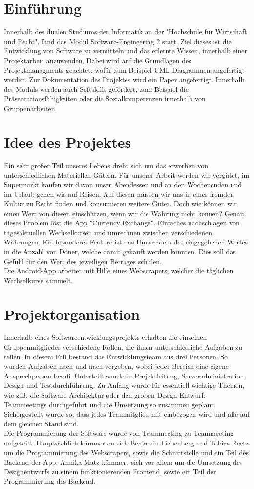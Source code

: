\documentclass[conference]{IEEEtran}
\begin{document}
\section{Einführung}
Innerhalb des dualen Studiums der Informatik an der "Hochschule für Wirtschaft und Recht", fand das Modul Software-Engineering 2 statt. Ziel dieses ist die Entwicklung von Software zu vermitteln und das erlernte Wissen, innerhalb einer Projektarbeit anzuwenden. Dabei wird auf die Grundlagen des Projektmanagments geachtet, wofür zum Beispiel UML-Diagrammen angefertigt werden. Zur Dokumentation des Projektes wird ein Paper angefertigt. 
Innerhalb des Moduls werden auch Softskills gefördert, zum Beispiel die Präsentationsfähigkeiten oder die Sozialkompetenzen innerhalb von Gruppenarbeiten.

\section{Idee des Projektes}
Ein sehr großer Teil unseres Lebens dreht sich um das erwerben von unterschiedlichen Materiellen Gütern. Für unserer Arbeit werden wir vergütet, im Supermarkt kaufen wir davon unser Abendessen und an den Wochenenden und im Urlaub gehen wir auf Reisen. Auf diesen müssen wir uns in einer fremden Kultur zu Recht finden und konsumieren weitere Güter. Doch wie können wir einen Wert von diesen einschätzen, wenn wir die Währung nicht kennen? Genau dieses Problem löst die App "Currency Exchange". Einfaches nachschlagen von tagesaktuellen Wechselkursen und umrechnen zwischen verschiedenen Währungen. Ein besonderes Feature ist das Umwandeln des eingegebenen Wertes in die Anzahl von Döner, welche damit gekauft werden könnten. Dies soll das Gefühl für den Wert des jeweiligen Betrages schulen.\\
Die  Android-App arbeitet mit Hilfe eines Webscrapers, welcher die täglichen Wechselkurse sammelt.


\section{Projektorganisation}
Innerhalb eines Softwareentwicklungsprojekts erhalten die einzelnen Gruppenmitglieder verschiedene Rollen, die ihnen unterschiedliche Aufgaben zu teilen. In diesem Fall bestand das Entwicklungsteam aus drei Personen. So wurden Aufgaben nach und nach vergeben, wobei jeder Bereich eine eigene Ansprechperson besaß. Unterteilt wurde in Projektleitung, Serveradministration, Design und Testdurchführung. Zu Anfang wurde für essentiell wichtige Themen, wie z.B. die Software-Architektur oder den groben Design-Entwurf, Teammeetings durchgeführt und die Umsetzung so zusammen geplant. Sichergestellt wurde so, dass jedes Teammitglied mit einbezogen wird und alle auf dem gleichen Stand sind. \\
Die Programmierung der Software wurde von Teammeeting zu Teammeeting aufgeteilt. Hauptsächlich kümmerten sich Benjamin Liebenberg und Tobias Reetz um die Programmierung des Webscrapers, sowie die Schnittstelle und ein Teil des Backend der App. Annika Matz kümmert sich vor allem um die Umsetzung des Designentwurfs zu einem funktionierenden Frontend, sowie ein Teil der Programmierung des Backend.
\end{document}
